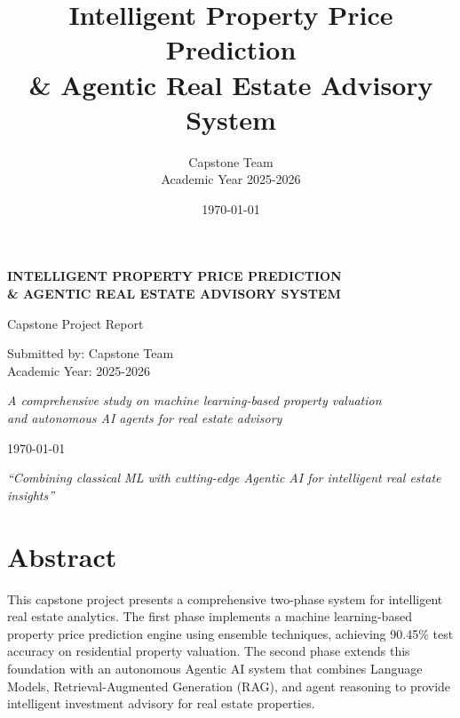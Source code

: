 \documentclass[11pt,a4paper]{article}
\title{\textbf{Intelligent Property Price Prediction \\ \& Agentic Real Estate Advisory System}}
\author{Capstone Team \\ Academic Year 2025-2026}
\date{\today}
\begin{document}
\begin{titlepage}
    \centering
    \vspace*{\fill}
    
    {\Large \textbf{INTELLIGENT PROPERTY PRICE PREDICTION}}\\
    {\Large \textbf{\& AGENTIC REAL ESTATE ADVISORY SYSTEM}}
    
    \vspace{0.5cm}
    
    {\large Capstone Project Report}
    
    \vspace{1cm}
    
    {\normalsize Submitted by: Capstone Team}\\
    {\normalsize Academic Year: 2025-2026}
    
    \vspace{1cm}
    
    {\small \textit{A comprehensive study on machine learning-based property valuation}}\\
    {\small \textit{and autonomous AI agents for real estate advisory}}
    
    \vspace{1.5cm}
    
    \today
    
    \vspace*{\fill}
    
    \textit{``Combining classical ML with cutting-edge Agentic AI for intelligent real estate insights''}
    
\end{titlepage}

\newpage
\tableofcontents
\newpage

\section{Abstract}

This capstone project presents a comprehensive two-phase system for intelligent real estate analytics. The first phase implements a machine learning-based property price prediction engine using ensemble techniques, achieving 90.45\% test accuracy on residential property valuation. The second phase extends this foundation with an autonomous Agentic AI system that combines Language Models, Retrieval-Augmented Generation (RAG), and agent reasoning to provide intelligent investment advisory for real estate properties.
\end{document}

